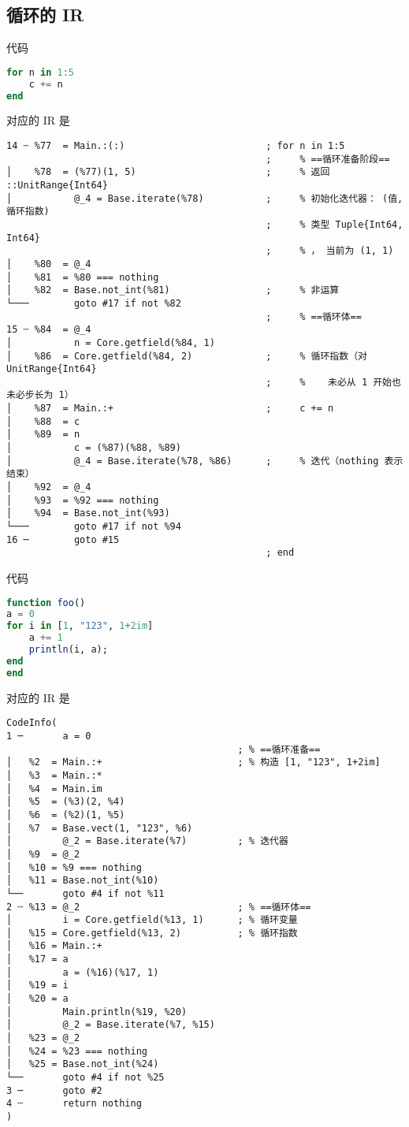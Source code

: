 \subsection{循环的 IR}
代码
\begin{lstlisting}[language=julia]
for n in 1:5
    c += n
end
\end{lstlisting}
对应的 IR 是
\begin{lstlisting}[language=none]
14 ┄ %77  = Main.:(:)                         ; for n in 1:5
                                              ;     % ==循环准备阶段==
│    %78  = (%77)(1, 5)                       ;     % 返回 ::UnitRange{Int64}
│           @_4 = Base.iterate(%78)           ;     % 初始化迭代器： (值, 循环指数)
                                              ;     % 类型 Tuple{Int64, Int64}
                                              ;     % ， 当前为 (1, 1)
│    %80  = @_4
│    %81  = %80 === nothing
│    %82  = Base.not_int(%81)                 ;     % 非运算
└───        goto #17 if not %82
                                              ;     % ==循环体==
15 ┄ %84  = @_4
│           n = Core.getfield(%84, 1)
│    %86  = Core.getfield(%84, 2)             ;     % 循环指数（对 UnitRange{Int64}
                                              ;     %    未必从 1 开始也未必步长为 1）
│    %87  = Main.:+                           ;     c += n
│    %88  = c
│    %89  = n
│           c = (%87)(%88, %89)
│           @_4 = Base.iterate(%78, %86)      ;     % 迭代（nothing 表示结束）
│    %92  = @_4
│    %93  = %92 === nothing
│    %94  = Base.not_int(%93)
└───        goto #17 if not %94
16 ─        goto #15
                                              ; end
\end{lstlisting}

代码
\begin{lstlisting}[language=julia]
function foo()
a = 0
for i in [1, "123", 1+2im]
    a += 1
    println(i, a);
end
end
\end{lstlisting}
对应的 IR 是
\begin{lstlisting}[language=none]
CodeInfo(
1 ─       a = 0
                                         ; % ==循环准备==
│   %2  = Main.:+                        ; % 构造 [1, "123", 1+2im]
│   %3  = Main.:*
│   %4  = Main.im
│   %5  = (%3)(2, %4)
│   %6  = (%2)(1, %5)
│   %7  = Base.vect(1, "123", %6)
│         @_2 = Base.iterate(%7)         ; % 迭代器
│   %9  = @_2
│   %10 = %9 === nothing
│   %11 = Base.not_int(%10)
└──       goto #4 if not %11
2 ┄ %13 = @_2                            ; % ==循环体==
│         i = Core.getfield(%13, 1)      ; % 循环变量
│   %15 = Core.getfield(%13, 2)          ; % 循环指数
│   %16 = Main.:+
│   %17 = a
│         a = (%16)(%17, 1)
│   %19 = i
│   %20 = a
│         Main.println(%19, %20)
│         @_2 = Base.iterate(%7, %15)
│   %23 = @_2
│   %24 = %23 === nothing
│   %25 = Base.not_int(%24)
└──       goto #4 if not %25
3 ─       goto #2
4 ┄       return nothing
)
\end{lstlisting}
